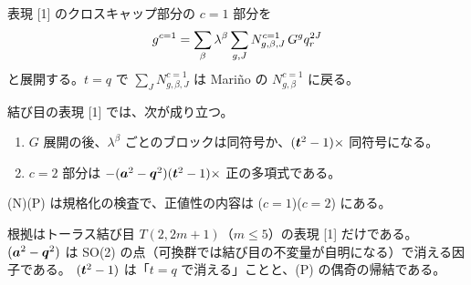 \begin{definition}\label{def:c1}
表現 [1] のクロスキャップ部分の $c = 1$ 部分を
\[
g^{c=1} = \sum_\beta \lambda^\beta \sum_{g, J} N^{c=1}_{g,\beta,J}\, G^g q_r^{2J}
\]
と展開する。$t = q$ で $\sum_J N^{c=1}_{g,\beta,J}$ は Mariño の $N^{c=1}_{g,\beta}$ に戻る。
\end{definition}

\begin{conjecture}[判定式]\label{conj:criterion}
結び目の表現 [1] では、次が成り立つ。
\begin{enumerate}
\item[($c{=}1$)] $G$ 展開の後、$\lambda^\beta$ ごとのブロックは同符号か、$(\bm{t}^2 - 1)\times$ 同符号になる。
\item[($c{=}2$)] $c = 2$ 部分は $-(\bm{a}^2 - \bm{q}^2)(\bm{t}^2 - 1)\times$ 正の多項式である。
\end{enumerate}
(N)(P) は規格化の検査で、正値性の内容は ($c{=}1$)($c{=}2$) にある。
\end{conjecture}
根拠はトーラス結び目 $T(2,2m+1)$（$m \le 5$）の表現 [1] だけである。
$(\bm{a}^2 - \bm{q}^2)$ は SO(2) の点（可換群では結び目の不変量が自明になる）で消える因子である。
$(\bm{t}^2 - 1)$ は「$t = q$ で消える」ことと、(P) の偶奇の帰結である。
